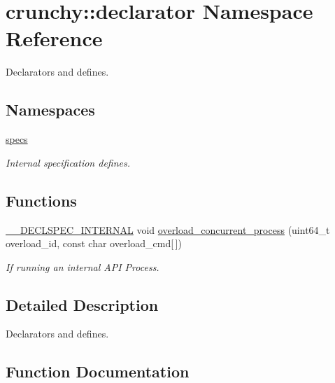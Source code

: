\hypertarget{namespacecrunchy_1_1declarator}{}\section{crunchy\+:\+:declarator Namespace Reference}
\label{namespacecrunchy_1_1declarator}


Declarators and defines.  


\subsection*{Namespaces}
\begin{DoxyCompactItemize}
\item 
 \hyperlink{namespacecrunchy_1_1declarator_1_1specs}{specs}
\begin{DoxyCompactList}\small\item\em Internal specification defines. \end{DoxyCompactList}\end{DoxyCompactItemize}
\subsection*{Functions}
\begin{DoxyCompactItemize}
\item 
\hyperlink{_c_r_h___declspec_8h_add2c9e5146b4eb6fdda70423049d29a4}{\+\_\+\+\_\+\+D\+E\+C\+L\+S\+P\+E\+C\+\_\+\+I\+N\+T\+E\+R\+N\+A\+L} void \hyperlink{namespacecrunchy_1_1declarator_a99b90638be455e5c536be8e8fd1fc535}{overload\+\_\+concurrent\+\_\+process} (uint64\+\_\+t overload\+\_\+id, const char overload\+\_\+cmd\mbox{[}$\,$\mbox{]})
\begin{DoxyCompactList}\small\item\em If running an internal A\+P\+I Process. \end{DoxyCompactList}\end{DoxyCompactItemize}


\subsection{Detailed Description}
Declarators and defines. 

\subsection{Function Documentation}
\hypertarget{namespacecrunchy_1_1declarator_a99b90638be455e5c536be8e8fd1fc535}{}
